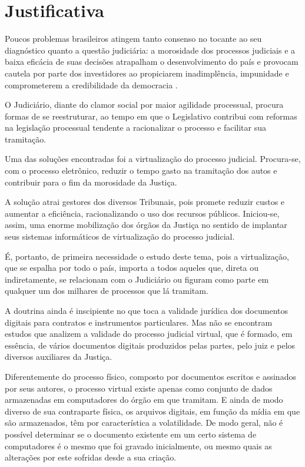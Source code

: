 \chapter{Justificativa}

  Poucos problemas brasileiros atingem tanto consenso no tocante
  ao seu diagnóstico quanto a questão judiciária: a morosidade
  dos processos judiciais e a baixa eficácia de suas decisões
  atrapalham o desenvolvimento do país e provocam cautela por
  parte dos investidores ao propiciarem inadimplência, impunidade
  e comprometerem a credibilidade da democracia
  \cite{RelatorioCNJ2005}.\par

  O Judiciário, diante do clamor social por maior agilidade
  processual, procura formas de se reestruturar, ao tempo em que o
  Legislativo contribui com reformas na legislação processual
  tendente a racionalizar o processo e facilitar sua tramitação.
  \par

  Uma das soluções encontradas foi a virtualização do processo
  judicial. Procura-se, com o processo eletrônico, reduzir o
  tempo gasto na tramitação dos autos e contribuir para o fim da
  morosidade da Justiça.\par

  A solução atrai gestores dos diversos Tribunais, pois promete
  reduzir custos e aumentar a eficiência, racionalizando o uso
  dos recursos públicos. Iniciou-se, assim, uma enorme
  mobilização dos órgãos da Justiça no sentido de implantar seus
  sistemas informáticos de virtualização do processo
  judicial.\par

  É, portanto, de primeira necessidade o estudo deste tema, pois
  a virtualização, que se espalha por todo o país, importa a
  todos aqueles que, direta ou indiretamente, se relacionam com o
  Judiciário ou figuram como parte em qualquer um dos milhares de
  processos que lá tramitam.\par

  A doutrina ainda é inscipiente no que toca a validade jurídica
  dos documentos digitais para contratos e instrumentos
  particulares. Mas não se encontram estudos que analizem a
  validade do processo judicial virtual, que é formado, em
  essência, de vários documentos digitais produzidos pelas
  partes, pelo juiz e pelos diversos auxiliares da Justiça.\par

  Diferentemente do processo físico, composto por documentos
  escritos e assinados por seus autores, o processo virtual
  existe apenas como conjunto de dados armazenadas em computadores
  do órgão em que tramitam. E ainda de modo diverso de sua
  contraparte física, os arquivos digitais, em função da mídia
  em que são armazenados, têm por característica a volatilidade.
  De modo geral, não é possível determinar se o documento
  existente em um certo sistema de computadores é o mesmo que foi
  gravado inicialmente, ou mesmo quais as alterações por este
  sofridas desde a sua criação.\par

